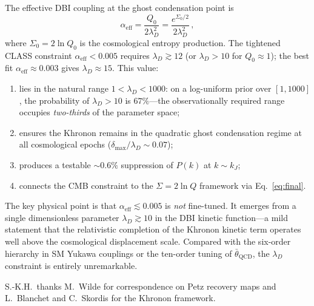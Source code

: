 \documentclass[prd,twocolumn,superscriptaddress,longbibliography,floatfix]{revtex4-2}
\begin{document}
The effective DBI coupling at the ghost
condensation point is
\begin{equation}
\alpha_{\mathrm{eff}} = \frac{Q_0}{2\lambda_D^2}
= \frac{e^{\Sigma_0/2}}{2\lambda_D^2}\,,
\label{eq:final}
\end{equation}
where $\Sigma_0 = 2\ln Q_0$ is the cosmological
entropy production.  The tightened CLASS constraint
$\alpha_{\mathrm{eff}} < 0.005$ requires
$\lambda_D \gtrsim 12$ (or $\lambda_D > 10$ for
$Q_0 \approx 1$); the best fit
$\alpha_{\mathrm{eff}} \approx 0.003$ gives
$\lambda_D \approx 15$.  This value:
\begin{enumerate}
\item lies in the natural range
$1 < \lambda_D < 1000$: on a log-uniform prior
over $[1, 1000]$, the probability of $\lambda_D > 10$
is $67\%$---the observationally required range
occupies \emph{two-thirds} of the parameter space;
\item ensures the Khronon remains in the
quadratic ghost condensation regime at all
cosmological epochs ($\delta_{\max}/\lambda_D
\sim 0.07$);
\item produces a testable $\sim\!0.6\%$ suppression
of $P(k)$ at $k \sim k_J$;
\item connects the CMB constraint to the
$\Sigma = 2\ln Q$ framework via
Eq.~\eqref{eq:final}.
\end{enumerate}

The key physical point is that
$\alpha_{\mathrm{eff}} \lesssim 0.005$ is
\emph{not} fine-tuned.  It emerges from a
single dimensionless parameter $\lambda_D \gtrsim 10$
in the DBI kinetic function---a mild statement
that the relativistic completion of the Khronon
kinetic term operates well above the cosmological
displacement scale.  Compared with the six-order
hierarchy in SM Yukawa couplings or the
ten-order tuning of $\bar{\theta}_{\mathrm{QCD}}$,
the $\lambda_D$ constraint is entirely unremarkable.


\begin{acknowledgments}
S.-K.H.\ thanks M.~Wilde for correspondence on
Petz recovery maps and L.~Blanchet and C.~Skordis
for the Khronon framework.
\end{acknowledgments}
\end{document}
